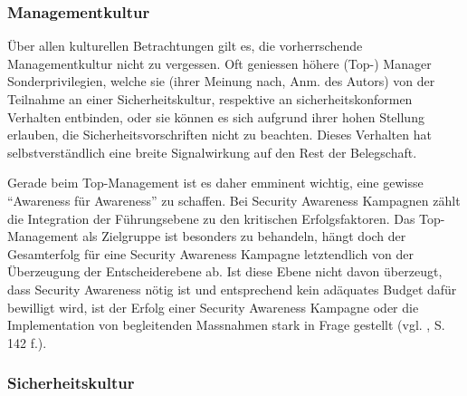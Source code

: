 \documentclass[../../main.tex]{subfiles}
\begin{document}
\subsubsection{Managementkultur}

\begin{sloppypar}
Über allen kulturellen Betrachtungen gilt es, die vorherrschende Managementkultur nicht zu vergessen. Oft geniessen höhere (Top-) Manager Sonderprivilegien, welche sie (ihrer Meinung nach, Anm. des Autors) von der Teilnahme an einer Sicherheitskultur, respektive an sicherheitskonformen Verhalten entbinden, oder sie können es sich aufgrund ihrer hohen Stellung erlauben, die Sicherheitsvorschriften nicht zu beachten. Dieses Verhalten hat selbstverständlich eine breite Signalwirkung auf den Rest der Belegschaft.

Gerade beim Top-Management ist es daher emminent wichtig, eine gewisse "`Awareness für Awareness"' zu schaffen. Bei Security Awareness Kampagnen zählt die Integration der Führungsebene zu den kritischen Erfolgsfaktoren. Das Top-Management als Zielgruppe ist besonders zu behandeln, hängt doch der Gesamterfolg für eine Security Awareness Kampagne letztendlich von der Überzeugung der Entscheiderebene ab. Ist diese Ebene nicht davon überzeugt, dass Security Awareness nötig ist und entsprechend kein adäquates Budget dafür bewilligt wird, ist der Erfolg einer Security Awareness Kampagne oder die Implementation von begleitenden Massnahmen stark in Frage gestellt (vgl. \citeauthor{helisch_security_2009} \citeyear{helisch_security_2009}, S. 142 f.).
\end{sloppypar}

\subsubsection{Sicherheitskultur}
\end{document}
